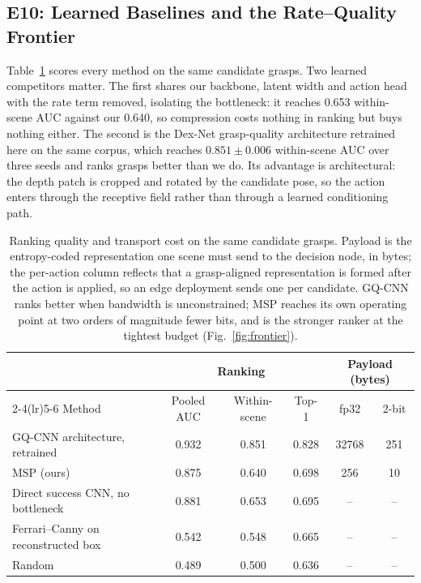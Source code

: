 \documentclass[letterpaper, 10pt, conference]{ieeeconf}
\begin{document}
\subsection{E10: Learned Baselines and the Rate--Quality Frontier}
\label{sec:baselines}
Table~\ref{tab:baselines} scores every method on the same candidate grasps. Two learned
competitors matter. The first shares our backbone, latent width and action head with the
rate term removed, isolating the bottleneck: it reaches 0.653 within-scene AUC against our
0.640, so compression costs nothing in ranking but buys nothing either. The second is the
Dex-Net grasp-quality architecture retrained here on the same corpus, which reaches
$0.851 \pm 0.006$ within-scene AUC over three seeds and ranks grasps better than we do.
Its advantage is architectural: the depth patch is cropped and rotated by the candidate
pose, so the action enters through the receptive field rather than through a learned
conditioning path.

\begin{table}[t]
\centering\small
\setlength{\tabcolsep}{4pt}
\caption{Ranking quality and transport cost on the same candidate grasps. Payload is the
entropy-coded representation one scene must send to the decision node, in bytes; the
per-action column reflects that a grasp-aligned representation is formed after the action
is applied, so an edge deployment sends one per candidate. GQ-CNN ranks better when
bandwidth is unconstrained; MSP reaches its own operating point at two orders of magnitude
fewer bits, and is the stronger ranker at the tightest budget (Fig.~\ref{fig:frontier}).}
\label{tab:baselines}
\begin{tabular}{lccccc}
\toprule
& \multicolumn{3}{c}{Ranking} & \multicolumn{2}{c}{Payload (bytes)} \\
\cmidrule(lr){2-4}\cmidrule(lr){5-6}
Method & Pooled AUC & Within-scene & Top-1 & fp32 & 2-bit \\
\midrule
GQ-CNN architecture, retrained & 0.932 & 0.851 & 0.828 & 32768 & 251 \\
MSP (ours) & 0.875 & 0.640 & 0.698 & 256 & 10 \\
Direct success CNN, no bottleneck & 0.881 & 0.653 & 0.695 & -- & -- \\
Ferrari--Canny on reconstructed box & 0.542 & 0.548 & 0.665 & -- & -- \\
Random & 0.489 & 0.500 & 0.636 & -- & -- \\
\bottomrule
\end{tabular}
\end{table}
\end{document}
